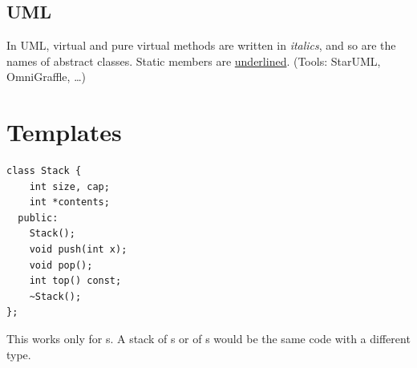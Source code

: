 \subsection*{UML}
In UML, virtual and pure virtual methods are written in \emph{italics}, and so
are the names of abstract classes. Static members are \underline{underlined}.
(Tools: StarUML, OmniGraffle, \dots)

\begin{center}
\end{center}

\section{Templates}
\begin{lstlisting}[style=cpp]
class Stack {
    int size, cap;
    int *contents;
  public:
    Stack();
    void push(int x);
    void pop();
    int top() const;
    ~Stack();
};
\end{lstlisting}
This works only for s. A stack of s or of
s would be the same code with a different type.

